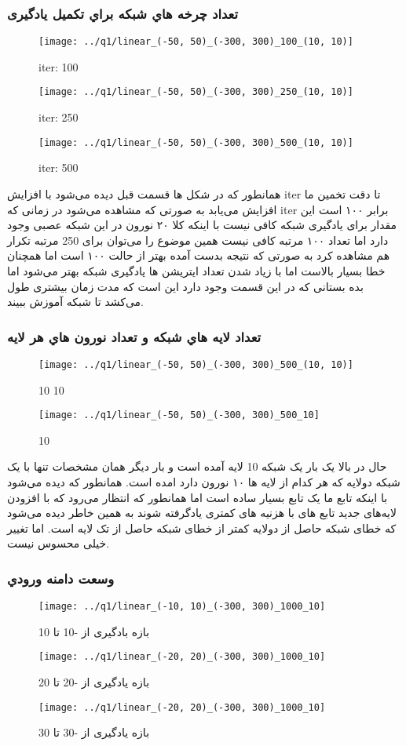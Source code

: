 \documentclass[a4paper,12pt]{article}
\begin{document}
\subsubsection{تعداد چرخه هاي شبکه براي تکمیل یادگیری}
\begin{figure}[!htb]
  \texttt{[image: ../q1/linear\_(-50, 50)\_(-300, 300)\_100\_(10, 10)]}
  \caption{iter: 100}
\endminipage\hfill
{}
  \texttt{[image: ../q1/linear\_(-50, 50)\_(-300, 300)\_250\_(10, 10)]}
  \caption{iter: 250}
\endminipage\hfill
{}
  \texttt{[image: ../q1/linear\_(-50, 50)\_(-300, 300)\_500\_(10, 10)]}
  \caption{iter: 500}
\endminipage

\end{figure}

همانطور که در شکل ها قسمت قبل دیده می‌شود با افزایش iter تا دقت تخمین ما افزایش می‌یابد به صورتی که مشاهده می‌شود در زمانی که iter برابر ۱۰۰ است این مقدار برای یادگیری شبکه کافی نیست با اینکه کلا ۲۰ نورون در این شبکه عصبی وجود دارد اما تعداد ۱۰۰ مرتبه کافی نیست همین موضوع را می‌توان برای 250 مرتبه تکرار هم مشاهده کرد به صورتی که نتیجه بدست آمده بهتر از حالت ۱۰۰ است اما همچنان خطا بسیار بالاست اما با زیاد شدن تعداد ایتریشن ها یادگیری شبکه بهتر می‌شود اما بده بستانی که در این قسمت وجود دارد این است که مدت زمان بیشتری طول می‌کشد تا شبکه آموزش ببیند.

 \subsubsection{تعداد لایه هاي شبکه و تعداد نورون هاي هر لایه}
\begin{figure}[!htb]
  \texttt{[image: ../q1/linear\_(-50, 50)\_(-300, 300)\_500\_(10, 10)]}
  \caption{10 10 }
\endminipage\hfill
{}
  \texttt{[image: ../q1/linear\_(-50, 50)\_(-300, 300)\_500\_10]}
  \caption{10}
\endminipage\hfill
\end{figure}

حال در بالا یک بار یک شبکه 10 لایه آمده است و بار دیگر همان مشخصات تنها با یک شبکه دولایه که هر کدام از لایه ها ۱۰ نورون دارد امده است. همانطور که دیده می‌شود با اینکه تابع ما یک تابع بسیار ساده است اما همانطور که انتظار می‌رود که با افزودن لایه‌های جدید تابع های با هزنیه های کمتری یادگرفته شوند به همین خاطر دیده می‌شود که خطای شبکه حاصل از دولایه کمتر از خطای شبکه حاصل از تک لایه است. اما تغییر خیلی محسوس نیست.
\newpage
\subsubsection{وسعت دامنه ورودي }
\begin{figure}[!htb]
  \texttt{[image: ../q1/linear\_(-10, 10)\_(-300, 300)\_1000\_10]}
  \caption{بازه بادگیری از -10 تا 10}
\endminipage\hfill
{}
  \texttt{[image: ../q1/linear\_(-20, 20)\_(-300, 300)\_1000\_10]}
  \caption{بازه یادگیری از -20 تا 20}
\endminipage\hfill
{}
  \texttt{[image: ../q1/linear\_(-20, 20)\_(-300, 300)\_1000\_10]}
  \caption{بازه یادگیری از -30 تا 30}
\endminipage
\end{figure}
\end{document}
